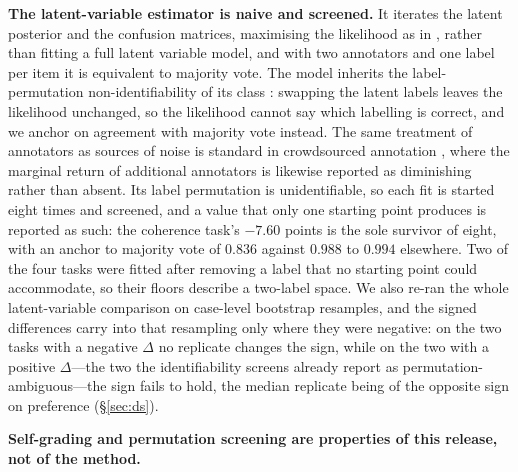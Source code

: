 \documentclass{article}
\begin{document}
\textbf{The latent-variable estimator is naive and screened.} It iterates the latent posterior and the confusion matrices, maximising the likelihood as in \cite{dempsterlairdrubin1977}, rather than fitting a full latent variable model, and with two annotators and one label per item it is equivalent to majority vote. The model inherits the label-permutation non-identifiability of its class \cite{stephens2000,jasra2005}: swapping the latent labels leaves the likelihood unchanged, so the likelihood cannot say which labelling is correct, and we anchor on agreement with majority vote instead. The same treatment of annotators as sources of noise is standard in crowdsourced annotation \cite{sheng2008getanotherlabel,jin2018crowdsourcingqc,kutlu2020rationales}, where the marginal return of additional annotators is likewise reported as diminishing rather than absent. Its label permutation is unidentifiable, so each fit is started eight times and screened, and a value that only one starting point produces is reported as such: the coherence task's $-7.60$ points is the sole survivor of eight, with an anchor to majority vote of $0.836$ against $0.988$ to $0.994$ elsewhere. Two of the four tasks were fitted after removing a label that no starting point could accommodate, so their floors describe a two-label space. We also re-ran the whole latent-variable comparison on case-level bootstrap resamples, and the signed differences carry into that resampling only where they were negative: on the two tasks with a negative $\Delta$ no replicate changes the sign, while on the two with a positive $\Delta$---the two the identifiability screens already report as permutation-ambiguous---the sign fails to hold, the median replicate being of the opposite sign on preference (\S\ref{sec:ds}).

\textbf{Self-grading and permutation screening are properties of this release, not of the method.}
\end{document}
